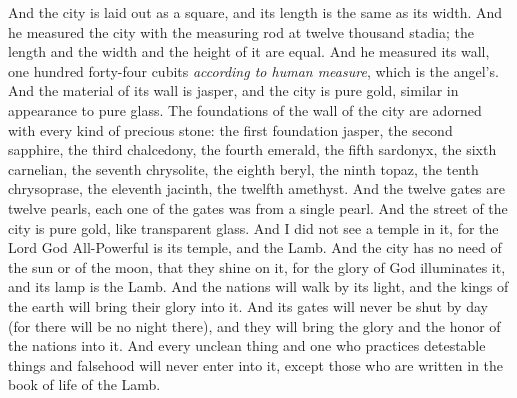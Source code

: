\begin{biblechapter}
\verse And the city is laid out as a square, and its length is the same as its width. And he measured the city with the measuring rod at twelve thousand stadia; the length and the width and the height of it are equal.
\verse And he measured its wall, one hundred forty-four cubits \textit{according to human measure}, which is the angel’s.
\verse And the material of its wall is jasper, and the city is pure gold, similar in appearance to pure glass.
\verse The foundations of the wall of the city are adorned with every kind of precious stone: the first foundation jasper, the second sapphire, the third chalcedony, the fourth emerald,
\verse the fifth sardonyx, the sixth carnelian, the seventh chrysolite, the eighth beryl, the ninth topaz, the tenth chrysoprase, the eleventh jacinth, the twelfth amethyst.
\verse And the twelve gates are twelve pearls, each one of the gates was from a single pearl. And the street of the city is pure gold, like transparent glass.
\verse And I did not see a temple in it, for the Lord God All-Powerful is its temple, and the Lamb.
\verse And the city has no need of the sun or of the moon, that they shine on it, for the glory of God illuminates it, and its lamp is the Lamb.
\verse And the nations will walk by its light, and the kings of the earth will bring their glory into it.
\verse And its gates will never be shut by day (for there will be no night there),
\verse and they will bring the glory and the honor of the nations into it.
\verse And every unclean thing and one who practices detestable things and falsehood will never enter into it, except those who are written in the book of life of the Lamb.
\end{biblechapter}

